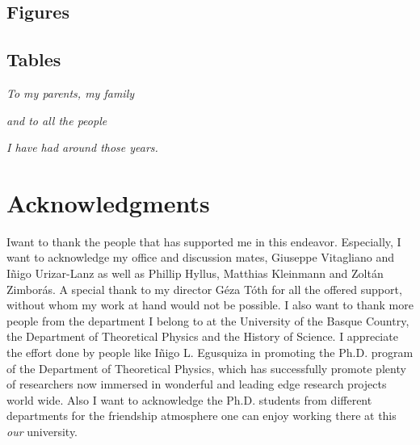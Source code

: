 \documentclass[12pt, letterpaper, twoside]{article}
\numberwithin{equation}{section}
\numberwithin{figure}{section}
\numberwithin{table}{section}
\begin{document}
\makeatletter
\newcommand\listoffigurename{Figures}
\newcommand\listoftablename{Tables}
\renewcommand\listoffigures{
  \subsection*{\listoffigurename}
  \@starttoc{lof}
}
\renewcommand\listoftables{
  \subsection*{\listoftablename}
}
\makeatother
\listoffigures
\listoftables


\cleardoublepage

\fancyfoot{}

\cleardoublepage
\setcounter{page}{1}

\vspace*{100pt}
\begin{center}
\emph{To my parents, my family}

\emph{and to all the people}

\emph{I have had around those years.}
\end{center}

\cleardoublepage

\fancyfoot[LE,RO]{\thepage}
\section*{Acknowledgments}

\lettrine[lines=2, findent=3pt,nindent=0pt]{I}{}want to thank the people that has supported me in this endeavor.
Especially, I want to acknowledge my office and discussion mates, Giuseppe Vitagliano and I\~nigo Urizar-Lanz as well as Phillip Hyllus, Matthias Kleinmann and Zolt\'an Zimbor\'as.
A special thank to my director G\'eza T\'oth for all the offered support, without whom my work at hand would not be possible.
I also want to thank more people from the department I belong to at the University of the Basque Country, the Department of Theoretical Physics and the History of Science.
I appreciate the effort done by people like I\~nigo L. Egusquiza in promoting the Ph.D. program of the Department of Theoretical Physics, which has successfully promote plenty of researchers now immersed in wonderful and leading edge research projects world wide.
Also I want to acknowledge the Ph.D. students from different departments for the friendship atmosphere one can enjoy working there at this \emph{our} university.
\end{document}
